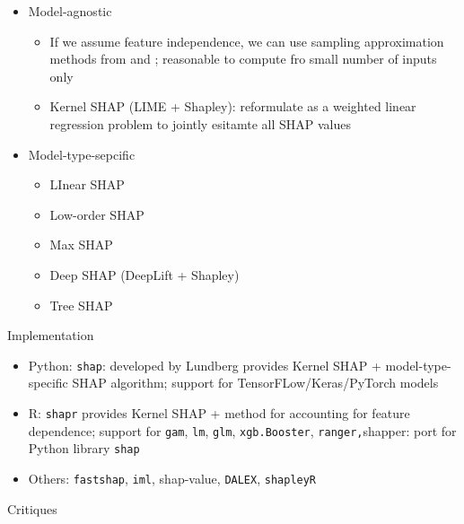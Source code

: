\documentclass[
]{book}
\begin{document}
\begin{itemize}
\item
  Model-agnostic

  \begin{itemize}
  \item
    If we assume feature independence, we can use sampling approximation methods from \citep{trumbelj2013} and \citep{datta2016}; reasonable to compute fro small number of inputs only
  \item
    Kernel SHAP (LIME + Shapley): reformulate as a weighted linear regression problem to jointly esitamte all SHAP values
  \end{itemize}
\item
  Model-type-sepcific

  \begin{itemize}
  \item
    LInear SHAP
  \item
    Low-order SHAP
  \item
    Max SHAP
  \item
    Deep SHAP (DeepLift + Shapley)
  \item
    Tree SHAP \citep{lundberg2018consistent}
  \end{itemize}
\end{itemize}

Implementation

\begin{itemize}
\item
  Python: \texttt{shap}: developed by Lundberg provides Kernel SHAP + model-type-specific SHAP algorithm; support for TensorFLow/Keras/PyTorch models
\item
  R: \texttt{shapr} provides Kernel SHAP + \citet{aas2021} method for accounting for feature dependence; support for \texttt{gam}, \texttt{lm}, \texttt{glm}, \texttt{xgb.Booster}, \texttt{ranger,}shapper: port for Python library \texttt{shap}
\item
  Others: \texttt{fastshap}, \texttt{iml}, shap-value, \texttt{DALEX}, \texttt{shapleyR}
\end{itemize}

Critiques
\end{document}

